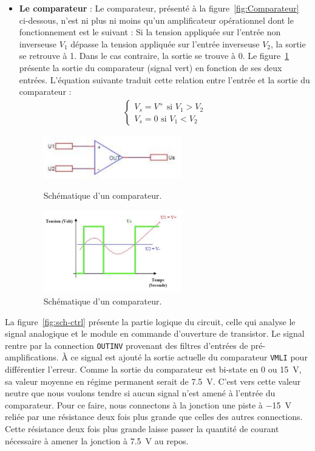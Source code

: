 \documentclass[10pt, oneside, a4paper]{article}
\begin{document}
\begin{itemize}
\item \noindent\textbf{Le comparateur} : Le comparateur, présenté à la figure~\ref{fig:Comparateur} ci-dessous, n'est ni plus ni moins qu'un amplificateur opérationnel dont le fonctionnement est le suivant : Si la tension appliquée sur l'entrée non inverseuse $V_{1}$ dépasse la tension appliquée sur l'entrée inverseuse $V_{2}$, la sortie se retrouve à 1. Dans le cas contraire, la sortie se trouve à 0. Le figure~\ref{fig:Comparateur_Graphe} présente la sortie du comparateur (signal vert) en fonction de ses deux entrées. L'équation suivante traduit cette relation entre l'entrée et la sortie du comparateur : 
\begin{gather}
\begin{cases}
 V_{s} = V^{+} \text{ si } V_{1} > V_{2}\\ 
 V_{s} = 0  \text{ si } V_{1} < V_{2}
\end{cases}
\end{gather}
\begin{figure}[!ht]
	\centering
	\includegraphics[width=6cm]{image/comparateur.png}
	\caption{Schématique d'un comparateur.}
	\label{fig:Comparateur}
	\centering
	\includegraphics[width=6cm]{image/Graphe_Comparateur.png}
	\caption{Schématique d'un comparateur.}
	\label{fig:Comparateur_Graphe}
\end{figure}


\end{itemize}
La figure~\ref{fig:sch-ctrl} présente la partie logique du circuit, celle qui analyse le signal analogique et le module en commande d'ouverture de transistor.
Le signal rentre par la connection \texttt{OUTINV} provenant des filtres d'entrées de pré-amplifications.
À ce signal est ajouté la sortie actuelle du comparateur \texttt{VMLI} pour différentier l'erreur.
Comme la sortie du comparateur est bi-state en 0 ou \SI{15}{\volt}, sa valeur moyenne en régime permanent serait de \SI{7.5}{\volt}.
C'est vers cette valeur \og{}neutre\fg{} que nous voulons tendre si aucun signal n'est amené à l'entrée du comparateur.
Pour ce faire, nous connectons à la jonction une piste à \SI{-15}{\volt} reliée par une résistance deux fois plus grande que celles des autres connections.
Cette résistance deux fois plus grande laisse passer la quantité de courant nécessaire à amener la jonction à \SI{7.5}{\volt} au repos.
\end{document}
